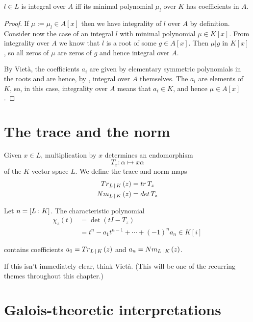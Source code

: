\begin{theorem}
  $l \in L$ is integral over $A$ iff its minimal polynomial $\mu_l$ over $K$ has
  coefficients in $A$.
\end{theorem}

\begin{proof}
  If $\mu := \mu_l \in A[x]$ then we have integrality of $l$ over $A$ by
  definition. Consider now the case of an integral $l$ with minimal polynomial
  $\mu \in K[x]$. From integrality over $A$ we know that $l$ is a root of some
  $g \in A[x]$. Then $\mu | g$ in $K[x]$, so all zeros of $\mu$ are zeros of $g$
  and hence integral over $A$.

  \npar By Viet\`a, the coefficients $a_i$ are given by elementary symmetric
  polynomials in the roots and are hence, by
  , integral over $A$ themselves. The $a_i$
  are elements of $K$, so, in this case, integrality over $A$ means that $a_i
  \in K$, and hence $\mu \in A[x]$.
\end{proof}

\section{The trace and the norm}

Given $x \in L$, multiplication by $x$ determines an endomorphism
\[ T_x : \alpha \mapsto x\alpha \] of the $K$-vector space $L$. We define the
trace and norm maps
\begin{align*}
  {{\mathnormal{Tr}}_{L \mathop{|} K}}\left(z\right) &= \operatorname{{\mathnormal{tr}}} T_z\\
  {{\mathnormal{Nm}}_{L \mathop{|} K}}\left(z\right) &= \operatorname{{\mathnormal{det}}} T_z
\end{align*}

Let $n = [L : K]$. The characteristic polynomial
\begin{align*}
  \chi_z(t) &= \det (tI - T_z)\\
            &= t^n - a_1t^{n-1} + \cdots + (-1)^n a_n \in K[i]
\end{align*}

contains coefficients $a_1 = {{\mathnormal{Tr}}_{L \mathop{|} K}}\left(z\right)$ and $a_n = {{\mathnormal{Nm}}_{L \mathop{|} K}}\left(z\right)$.

\begin{remark}
  If this isn't immediately clear, think Viet\`a. (This will be one of the
  recurring themes throughout this chapter.)
\end{remark}

\section{Galois-theoretic interpretations}

